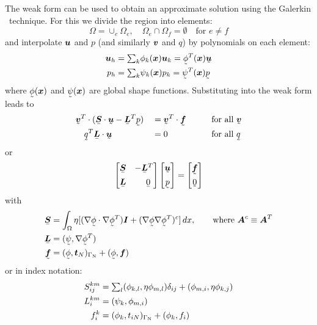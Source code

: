The weak form can be used to obtain an approximate solution using the Galerkin \fem\
technique. For this we divide the region into elements:
\[
\Omega=\cup_e\Omega_e, \quad\Omega_{e}\cap\Omega_{f}=\emptyset\quad
   \text{for }e\neq f
\]
and interpolate $\boldsymbol{u}$ and $p$ (and similarly $\boldsymbol{v}$ and $q$) by
polynomials on each element:
\[
 \begin{split}
    \vek u_h&=\tsum_k \phi_k(\vek x)\vek u_k=\col\phi^T(\vek x)\col{\vek u}\\
    p_h&=\tsum_k \psi_k(\vek x) p_k=\col\psi^T(\vek x)\col{ p}
 \end{split}
\]
where $\col\phi(\vek x)$ and $\col\psi(\vek x)$
are global shape functions.  Substituting into the
weak form leads to
\begin{alignat*}{3}
   &\col{\vek v}^T\cdot(\mat{\ten S}\cdot\col{\vek u}-\mat{\vek L}^T\col p)&&=
    \col{\vek v}^T\cdot\col{\vek f}\qquad&&\text{for all }\col{\vek v}\\
  &\quad\col q^T\mat{\vek L}\cdot\col{\vek u}&&=0\qquad&&\text{for all }\col{q}
\end{alignat*}
or
\[
 \begin{bmatrix}
   \mat{\ten S} &-\mat{\vek L}^T \\[1ex]
   \mat{\vek L} &\quad \mat 0
 \end{bmatrix}
 \begin{bmatrix}
    \col{\vek u}\\[1ex]
    \col p
 \end{bmatrix}=
 \begin{bmatrix}
    \col{\vek f}\\[1ex]
    \col 0
 \end{bmatrix}
\]
with 
\begin{align*}
   \mat{\ten S}&=\int_\Omega\eta[(\nabla\col{\phi}\cdot\nabla\col{\phi}^T)\ten
I+                            (\nabla\col{\phi}\nabla\col{\phi}^T)^c]\D x,
\qquad\text{where }\ten A^c\equiv\ten A^T\\
\mat{\vek L}&=(\col{\psi},\nabla\col\phi^T)\\
 \col{\vek f}&=(\col{\phi},\vek t_{N})_{\Gamma_{\text{N}}}+(\col{\phi},\vek f)
\end{align*}
or in index notation:
\begin{align*}
       S_{ij}^{km}&= {\textstyle\sum}_l(\phi_{k,l},\eta\phi_{m,l})\delta_{ij}+
          (\phi_{m,i},\eta\phi_{k,j})\\
    L_i^{km}&=(\psi_k,\phi_{m,i})\\
     f^k_i&=(\phi_k,t_{iN})_{\Gamma_{\text{N}}}+(\phi_k,f_i)
\end{align*}
